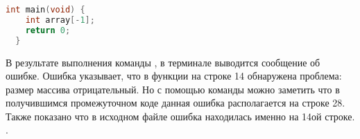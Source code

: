 \begin{lstlisting}[language=c, caption={Пример функции main с ошибкой}, label={lst:mainerrornegativeone}]
  int main(void) {
    int array[-1];
    return 0;
  }
\end{lstlisting}

В результате выполнения команды , в терминале выводится сообщение об ошибке.
Ошибка указывает, что в функции  на строке 14 обнаружена проблема: размер массива  отрицательный.
Но с помощью команды  можно заметить что в получившимся промежуточном коде данная ошибка располагается на строке 28.
Также показано что в исходном файле  ошибка находилась именно на 14ой строке.
.

